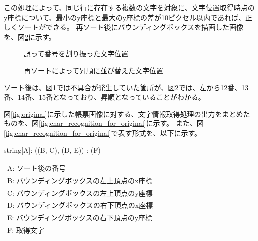 この処理によって、同じ行に存在する複数の文字を対象に、文字位置取得時点のy座標について、最小のy座標と最大のy座標の差が10ピクセル以内であれば、正しくソートができる。
再ソート後にバウンディングボックスを描画した画像を、図\ref{fig:after_sorted_string}に示す。

\begin{figure}[tp]
    \begin{center}
        \caption{誤って番号を割り振った文字位置}
        \label{fig:before_sorted_string}
    \end{center}
\end{figure}

\begin{figure}[tp]
    \begin{center}
        \caption{再ソートによって昇順に並び替えた文字位置}
        \label{fig:after_sorted_string}
    \end{center}
\end{figure}

ソート後は、図\ref{fig:before_sorted_string}では不具合が発生していた箇所が、図\ref{fig:after_sorted_string}では、左から12番、13番、14番、15番となっており、昇順となっていることがわかる。

図\ref{fig:original}に示した帳票画像に対する、文字情報取得処理の出力をまとめたものを、図\ref{fig:char_recognition_for_original}に示す。
また、図\ref{fig:char_recognition_for_original}で表す形式を、以下に示す。

\begin{center}
    string[A]: ((B, C), (D, E)) : (F)
\end{center}

\begin{center}
    \begin{tabular}{l}
    A: ソート後の番号\\  
    B: バウンディングボックスの左上頂点のx座標\\
    C: バウンディングボックスの左上頂点のy座標\\  
    D: バウンディングボックスの右下頂点のx座標\\
    E: バウンディングボックスの右下頂点のy座標\\
    F: 取得文字\\
    \end{tabular}
\end{center}

